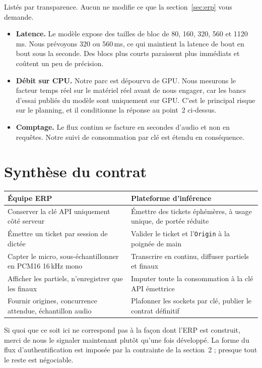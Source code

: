 \documentclass[11pt,a4paper]{article}
\begin{document}
Listés par transparence. Aucun ne modifie ce que la section~\ref{sec:erp} vous demande.

\begin{itemize}
  \item \textbf{Latence.} Le modèle expose des tailles de bloc de 80, 160, 320, 560 et
        1120\,ms. Nous prévoyons 320 ou 560\,ms, ce qui maintient la latence de bout en
        bout sous la seconde. Des blocs plus courts paraissent plus immédiats et coûtent
        un peu de précision.
  \item \textbf{Débit sur CPU.} Notre parc est dépourvu de GPU. Nous mesurons le facteur
        temps réel sur le matériel réel avant de nous engager, car les bancs d'essai
        publiés du modèle sont uniquement sur GPU. C'est le principal risque sur le
        planning, et il conditionne la réponse au point~2 ci-dessus.
  \item \textbf{Comptage.} Le flux continu se facture en secondes d'audio et non en
        requêtes. Notre suivi de consommation par clé est étendu en conséquence.
\end{itemize}

\section{Synthèse du contrat}

\begin{center}
\renewcommand{\arraystretch}{1.45}
\begin{tabular}{@{}p{7.1cm}p{7.1cm}@{}}
\toprule
{\color{accent}\bfseries Équipe ERP} & {\color{accent}\bfseries Plateforme d'inférence} \\
\midrule
Conserver la clé API uniquement côté serveur &
Émettre des tickets éphémères, à usage unique, de portée réduite \\
Émettre un ticket par session de dictée &
Valider le ticket et l'\texttt{Origin} à la poignée de main \\
Capter le micro, sous-échantillonner en PCM16 16\,kHz mono &
Transcrire en continu, diffuser partiels et finaux \\
Afficher les partiels, n'enregistrer que les finaux &
Imputer toute la consommation à la clé API émettrice \\
Fournir origines, concurrence attendue, échantillon audio &
Plafonner les sockets par clé, publier le contrat définitif \\
\bottomrule
\end{tabular}
\end{center}

\vspace{1.1em}
\noindent
Si quoi que ce soit ici ne correspond pas à la façon dont l'ERP est construit, merci de
nous le signaler maintenant plutôt qu'une fois développé. La forme du flux
d'authentification est imposée par la contrainte de la section~2 ; presque tout le reste
est négociable.
\end{document}
